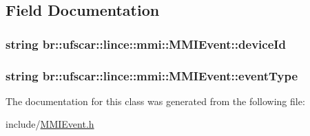 \subsection{Field Documentation}
\hypertarget{classbr_1_1ufscar_1_1lince_1_1mmi_1_1MMIEvent_ab49d18c433659ed8e7dbdaa9004839d5}{
\subsubsection[{deviceId}]{\setlength{\rightskip}{0pt plus 5cm}string {\bf br::ufscar::lince::mmi::MMIEvent::deviceId}}}
\label{classbr_1_1ufscar_1_1lince_1_1mmi_1_1MMIEvent_ab49d18c433659ed8e7dbdaa9004839d5}
\hypertarget{classbr_1_1ufscar_1_1lince_1_1mmi_1_1MMIEvent_af26d77edf2187a0536c4365a3aaaf531}{
\subsubsection[{eventType}]{\setlength{\rightskip}{0pt plus 5cm}string {\bf br::ufscar::lince::mmi::MMIEvent::eventType}}}
\label{classbr_1_1ufscar_1_1lince_1_1mmi_1_1MMIEvent_af26d77edf2187a0536c4365a3aaaf531}


The documentation for this class was generated from the following file:\begin{DoxyCompactItemize}
\item 
include/\hyperlink{MMIEvent_8h}{MMIEvent.h}\end{DoxyCompactItemize}
